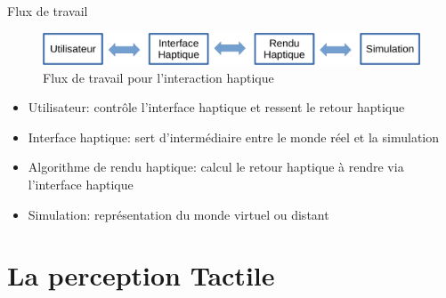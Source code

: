 \documentclass[compress, noflama]{beamer}
\begin{document}
\begin{frame}{Flux de travail}

\begin{figure}
\centering
\includegraphics[width=\linewidth]{images/schema_haptique}	
\caption{Flux de travail pour l'interaction haptique}
\end{figure}

\begin{itemize}
\item Utilisateur: contrôle l'interface haptique et ressent le retour haptique
\item Interface haptique: sert d'intermédiaire entre le monde réel et la simulation
\item Algorithme de rendu haptique: calcul le retour haptique à rendre via l'interface haptique
\item Simulation: représentation du monde virtuel ou distant
\end{itemize}	
\end{frame}

\section{La perception Tactile}
\end{document}
